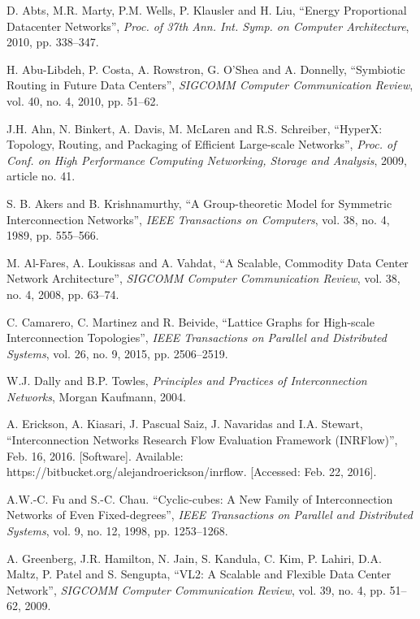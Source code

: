 \documentclass{article}
\begin{document}
\begin{thebibliography}{99}

 D. Abts, M.R. Marty, P.M. Wells, P. Klausler and H. Liu, ``Energy Proportional Datacenter Networks'', \emph{Proc. of \emph{37\/}th Ann. Int. Symp. on Computer Architecture}, 2010, pp. 338--347.

 H. Abu-Libdeh, P. Costa, A. Rowstron, G. O’Shea and A. Donnelly, ``Symbiotic Routing in Future Data Centers'', \emph{SIGCOMM Computer Communication Review}, vol. 40, no. 4, 2010, pp. 51--62.

 J.H. Ahn, N. Binkert, A. Davis, M. McLaren and R.S. Schreiber, ``HyperX: Topology, Routing, and Packaging of Efficient Large-scale Networks'', \emph{Proc. of Conf. on High Performance Computing Networking, Storage and Analysis}, 2009, article no. 41.

 S. B. Akers and B. Krishnamurthy, ``A Group-theoretic Model for Symmetric Interconnection Networks'', \emph{IEEE Transactions on Computers}, vol. 38, no. 4, 1989, pp. 555--566.

 M. Al-Fares, A. Loukissas and A. Vahdat, ``A Scalable, Commodity Data Center Network Architecture'', \emph{SIGCOMM Computer Communication Review}, vol. 38, no. 4, 2008, pp. 63--74.

 C. Camarero, C. Martinez and R. Beivide, ``Lattice Graphs for High-scale Interconnection Topologies'', \emph{IEEE Transactions on Parallel and Distributed Systems}, vol. 26, no. 9, 2015, pp. 2506--2519.

 W.J. Dally and B.P. Towles, \emph{Principles and Practices of Interconnection Networks}, Morgan Kaufmann, 2004.

 A. Erickson, A. Kiasari,  J. Pascual Saiz, J. Navaridas and I.A. Stewart, ``{I}nterconnection {N}etworks {R}esearch {F}low {E}valuation {F}ramework ({INRFlow})'', Feb. 16, 2016. [Software]. Available: https://bitbucket.org/alejandroerickson/inrflow. [Accessed: Feb. 22, 2016].









 A.W.-C. Fu and S.-C. Chau. ``Cyclic-cubes: A New Family of Interconnection Networks of Even Fixed-degrees'', \emph{IEEE Transactions on Parallel and Distributed Systems}, vol. 9, no. 12, 1998, pp. 1253--1268.

  A. Greenberg, J.R. Hamilton, N. Jain, S. Kandula, C. Kim, P. Lahiri, D.A. Maltz, P. Patel and S. Sengupta, ``VL2: A Scalable and Flexible Data Center Network'', \emph{SIGCOMM Computer Communication Review}, vol. 39, no. 4, pp. 51--62, 2009.


\end{thebibliography}
\end{document}
